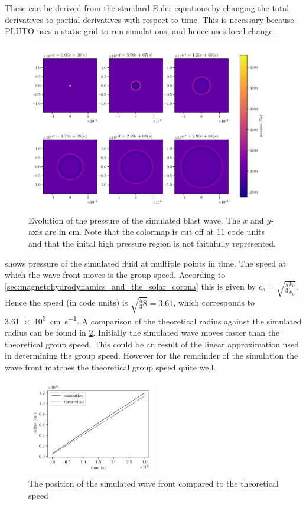 \documentclass[a4paper]{article}
\numberwithin{figure}{section}
\numberwithin{equation}{section}
\begin{document}
These can be derived from the standard Euler equations by changing the total derivatives to partial derivatives with respect to time. This is necessary because PLUTO uses a static grid to run simulations, and hence uses local change. 
\begin{figure}[h]
	\centering
	\includegraphics[width=\textwidth]{figures/blast_wave.pdf}
	\caption{Evolution of the pressure of the simulated blast wave. The $x$ and $y$-axis are in \si{cm}. Note that the colormap is cut off at $11$ code units and that the inital high pressure region is not faithfully represented.}
	\label{fig:blastwave}
\end{figure}

 shows pressure of the simulated fluid at multiple points in time. 
The speed at which the wave front moves is the group speed. 
According to \cref{sec:magnetohydrodynamics_and_the_solar_corona} this is given by $c_s = \sqrt{\frac{5}{3} \frac{p_0}{\rho_0}} $.
Hence the speed (in code units) is $\sqrt{\frac{5}{3}8} = 3.61$, which corresponds to \SI{3.61e5}{\centi\metre\per\second}.
A comparison of the theoretical radius against the simulated radius can be found in \cref{fig:wave_front_speed}. 
Initially the simulated wave moves faster than the theoretical group speed. 
This could be an result of the linear approximation used in determining the group speed.
However for the remainder of the simulation the wave front matches the theoretical group speed quite well.


\begin{figure}[h]
	\centering
	\includegraphics[width=0.5\textwidth]{figures/wavefront_position.pdf}
	\caption{The position of the simulated wave front compared to the theoretical speed}
	\label{fig:wave_front_speed}
\end{figure}
\end{document}
